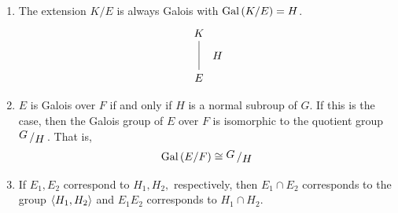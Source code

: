 \begin{theorem}
\begin{enumerate}
$$\begin{tikzcd}[column sep=large, row sep=large]
            F
        \end{tikzcd}
        $$
        \item The extension $K/E$ is always Galois with $\text{Gal}\left(K/E\right)=H$.
        $$
        \begin{tikzcd}[column sep=large, row sep=large]
            K \arrow[d, dash, "\textstyle \quad H" right] \\
            E
        \end{tikzcd}
        $$
        \item $E$ is Galois over $F$ if and only if $H$ is a normal subroup of $G$. If this is the case, then the Galois group of $E$ over $F$ is isomorphic to the quotient group $\quotient{G}{H}$. That is,
        $$\Gal{E/F} \cong \quotient{G}{H}$$
        \item If $E_1, E_2$ correspond to $H_1, H_2,$ respectively, then $E_1 \cap E_2$ corresponds to the group $\left\langle H_1, H_2 \right\rangle$ and $E_1E_2$ corresponds to $H_1 \cap H_2$.
    \end{enumerate}
\end{theorem}

